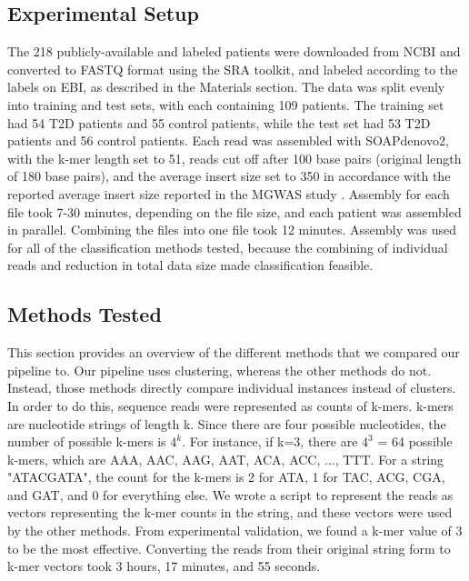 
\subsection{Experimental Setup}

The 218 publicly-available and labeled patients were downloaded from NCBI and converted to FASTQ format using the SRA toolkit, and labeled according to the labels on EBI, as described in the Materials section. The data was split evenly into training and test sets, with each containing 109 patients. The training set had 54 T2D patients and 55 control patients, while the test set had 53 T2D patients and 56 control patients. Each read was assembled with SOAPdenovo2, with the k-mer length set to 51, reads cut off after 100 base pairs (original length of 180 base pairs), and the average insert size set to 350 in accordance with the reported average insert size reported in the MGWAS study \cite{qin041012}. Assembly for each file took 7-30 minutes, depending on the file size, and each patient was assembled in parallel. Combining the files into one file took 12 minutes. Assembly was used for all of the classification methods tested, because the combining of individual reads and reduction in total data size made classification feasible.

\subsection{Methods Tested}

This section provides an overview of the different methods that we compared our pipeline to. Our pipeline uses clustering, whereas the other methods do not. Instead, those methods directly compare individual instances instead of clusters. In order to do this, sequence reads were represented as counts of k-mers. k-mers are nucleotide strings of length k. Since there are four possible nucleotides, the number of possible k-mers is \(4^k\). For instance, if k=3, there are \(4^3\) = 64 possible k-mers, which are AAA, AAC, AAG, AAT, ACA, ACC, ..., TTT. For a string "ATACGATA", the count for the k-mers is 2 for ATA, 1 for TAC, ACG, CGA, and GAT, and 0 for everything else. We wrote a script to represent the reads as vectors representing the k-mer counts in the string, and these vectors were used by the other methods. From experimental validation, we found a k-mer value of 3 to be the most effective. Converting the reads from their original string form to k-mer vectors took 3 hours, 17 minutes, and 55 seconds.

